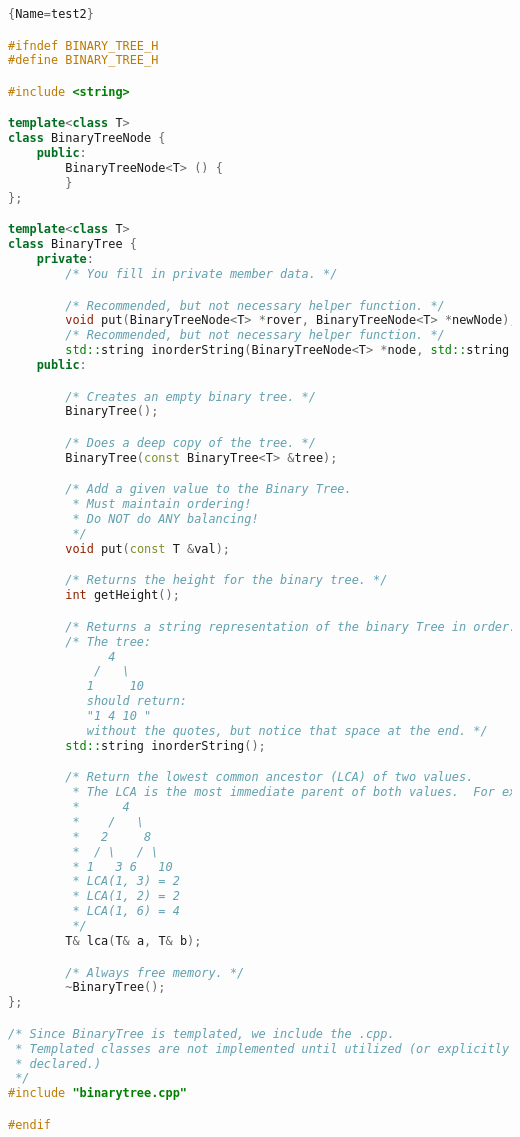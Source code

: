 \documentclass[12pt]{article}
\begin{document}
\begin{lstlisting}[language=C++]{Name=test2}

#ifndef BINARY_TREE_H
#define BINARY_TREE_H

#include <string>

template<class T>
class BinaryTreeNode {
    public:
        BinaryTreeNode<T> () {
        }
};

template<class T>
class BinaryTree {
    private:
        /* You fill in private member data. */

        /* Recommended, but not necessary helper function. */
        void put(BinaryTreeNode<T> *rover, BinaryTreeNode<T> *newNode);
        /* Recommended, but not necessary helper function. */
        std::string inorderString(BinaryTreeNode<T> *node, std::string &ret);
    public:

        /* Creates an empty binary tree. */
        BinaryTree();

        /* Does a deep copy of the tree. */
        BinaryTree(const BinaryTree<T> &tree);

        /* Add a given value to the Binary Tree. 
         * Must maintain ordering!
         * Do NOT do ANY balancing!
         */
        void put(const T &val);

        /* Returns the height for the binary tree. */
        int getHeight();

        /* Returns a string representation of the binary Tree in order. */
        /* The tree:
              4
            /   \
           1     10
           should return:
           "1 4 10 "
           without the quotes, but notice that space at the end. */
        std::string inorderString();

        /* Return the lowest common ancestor (LCA) of two values.
         * The LCA is the most immediate parent of both values.  For example:
         *      4
         *    /   \
         *   2     8
         *  / \   / \
         * 1   3 6   10
         * LCA(1, 3) = 2
         * LCA(1, 2) = 2
         * LCA(1, 6) = 4
         */
        T& lca(T& a, T& b);

        /* Always free memory. */
        ~BinaryTree();
};

/* Since BinaryTree is templated, we include the .cpp.
 * Templated classes are not implemented until utilized (or explicitly 
 * declared.)
 */
#include "binarytree.cpp"

#endif
\end{lstlisting}
\end{document}
